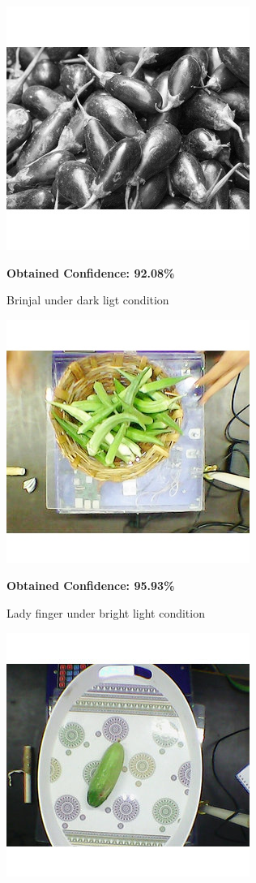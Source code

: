 \documentclass[a4paper,12pt,oneside]{book}
\begin{document}
\begin{itemize}
	  \begin{figure}[!ht]
	  	\centering
	  	\includegraphics[width=0.5\linewidth]{brinjal-dark}
	  	\caption{Brinjal under dark ligt condition} \textbf{Obtained Confidence: 92.08\%}
	  	\label{fig:brinjal-dark}
	  \end{figure}
	 \hfill
	  \begin{figure}[!ht]
	  	\centering
	  	\includegraphics[width=0.5\linewidth]{"lady_finger - light"}
	  	\caption{Lady finger under bright light condition}\textbf{ Obtained Confidence: 95.93\%}
	  	\label{fig:ladyfinger---light}
	  \end{figure}
  \hfill
	  \begin{figure}[!ht]
	  	\centering
	  	\includegraphics[width=0.5\linewidth]{cucumber-tray}

\end{figure}
\end{itemize}
\end{document}
